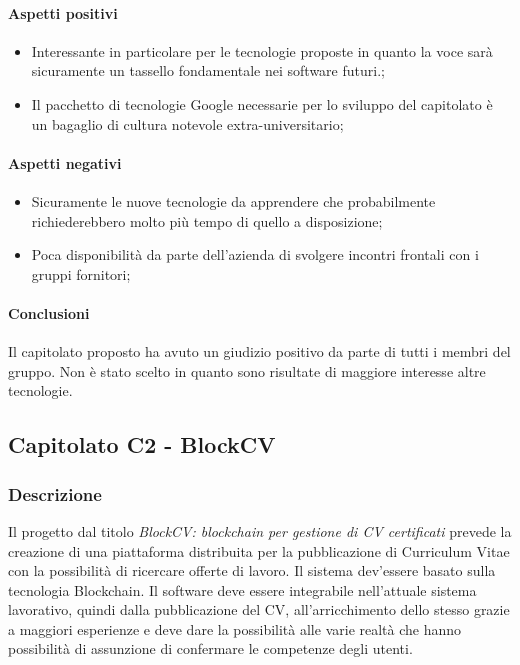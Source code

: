 			\paragraph{Aspetti positivi} \Spazio
				\begin{itemize}
				\item {Interessante in particolare per le tecnologie proposte in quanto la voce sarà sicuramente un tassello fondamentale nei software futuri.;}
				\item {Il pacchetto di tecnologie Google necessarie per lo sviluppo del capitolato è un bagaglio di cultura notevole extra-universitario;}	
			\end{itemize}
			\paragraph{Aspetti negativi} \Spazio
			\begin{itemize}
				\item {Sicuramente le nuove tecnologie da apprendere che probabilmente richiederebbero molto più tempo di quello a disposizione;}
				\item {Poca disponibilità da parte dell'azienda di svolgere incontri frontali con i gruppi fornitori;}	
			\end{itemize} 
			\paragraph{Conclusioni} \Spazio
			Il capitolato proposto ha avuto un giudizio positivo da parte di tutti i membri del gruppo. Non è stato scelto in quanto sono risultate di maggiore interesse altre tecnologie.
			
	\subsection{Capitolato C2 - BlockCV}
	\subsubsection{Descrizione}
	Il progetto dal titolo \emph{BlockCV: blockchain per gestione di CV certificati} prevede la creazione di una piattaforma distribuita per la pubblicazione di Curriculum Vitae con la possibilità di ricercare offerte di lavoro. Il sistema dev'essere basato sulla tecnologia Blockchain.
	Il software deve essere integrabile nell'attuale sistema lavorativo, quindi dalla pubblicazione del CV, all'arricchimento dello stesso grazie a maggiori esperienze e deve dare la possibilità alle varie realtà che hanno possibilità di assunzione di confermare le competenze degli utenti.    
